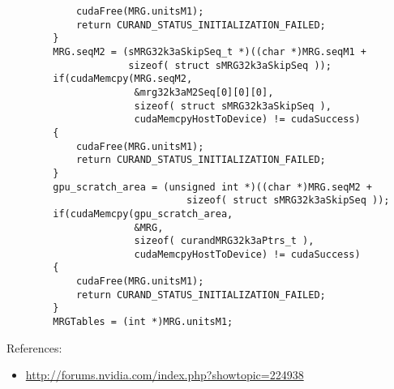 \begin{verbatim}
            cudaFree(MRG.unitsM1);
            return CURAND_STATUS_INITIALIZATION_FAILED;
        }
        MRG.seqM2 = (sMRG32k3aSkipSeq_t *)((char *)MRG.seqM1 + 
                     sizeof( struct sMRG32k3aSkipSeq ));
        if(cudaMemcpy(MRG.seqM2, 
                      &mrg32k3aM2Seq[0][0][0],
                      sizeof( struct sMRG32k3aSkipSeq ), 
                      cudaMemcpyHostToDevice) != cudaSuccess)
        {
            cudaFree(MRG.unitsM1);
            return CURAND_STATUS_INITIALIZATION_FAILED;
        }
        gpu_scratch_area = (unsigned int *)((char *)MRG.seqM2 + 
                               sizeof( struct sMRG32k3aSkipSeq ));
        if(cudaMemcpy(gpu_scratch_area, 
                      &MRG,
                      sizeof( curandMRG32k3aPtrs_t ), 
                      cudaMemcpyHostToDevice) != cudaSuccess)
        {
            cudaFree(MRG.unitsM1);
            return CURAND_STATUS_INITIALIZATION_FAILED;
        }
        MRGTables = (int *)MRG.unitsM1;
\end{verbatim}

References:
\begin{itemize}
  \item \url{http://forums.nvidia.com/index.php?showtopic=224938}
\end{itemize}
